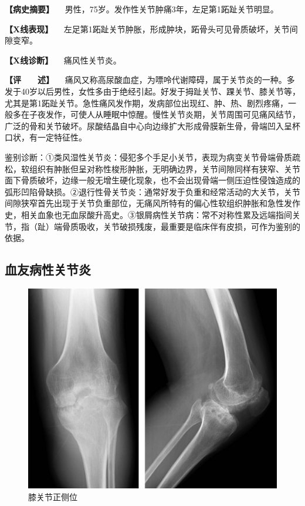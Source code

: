 \textbf{【病史摘要】}
　男性，75岁。发作性关节肿痛3年，左足第1跖趾关节明显。

\textbf{【X线表现】}
　左足第1跖趾关节肿胀，形成肿块，跖骨头可见骨质破坏，关节间隙变窄。

\textbf{【X线诊断】} 　痛风性关节炎。

\textbf{【评　　述】}
　痛风又称高尿酸血症，为嘌呤代谢障碍，属于关节炎的一种。多发于40岁以后男性，女性多由于绝经引起。好发于拇趾关节、踝关节、膝关节等，尤其是第1跖趾关节。急性痛风发作期，发病部位出现红、肿、热、剧烈疼痛，一般多在子夜发作，可使人从睡眠中惊醒。慢性关节炎期，关节周围可见痛风结节，广泛的骨和关节破坏。尿酸结晶自中心向边缘扩大形成骨膜新生骨，骨端凹入呈杯口状，有一定特征性。

鉴别诊断：①类风湿性关节炎：侵犯多个手足小关节，表现为病变关节骨端骨质疏松，软组织有肿胀但呈对称性梭形肿胀，无明确边界，关节间隙同样有狭窄、关节面下骨质破坏，边缘一般无增生硬化现象，也不会出现骨端一侧压迫性侵蚀造成的弧形凹陷骨缺损。②退行性骨关节炎：通常好发于负重和经常活动的大关节，关节间隙狭窄首先出现于关节负重部位，无痛风所特有的偏心性软组织肿胀和急性发作史，相关血象也无血尿酸升高史。③银屑病性关节病：常不对称性累及远端指间关节，指（趾）端骨质吸收，关节破损残废，最重要是临床伴有皮损，可作为鉴别的依据。

\subsection{血友病性关节炎}

\begin{figure}[!htbp]
 \centering
 \includegraphics{./images/Image00128.jpg}
 \captionsetup{justification=centering}
 \caption{膝关节正侧位}
 \label{fig2-8-14}
  \end{figure} 

